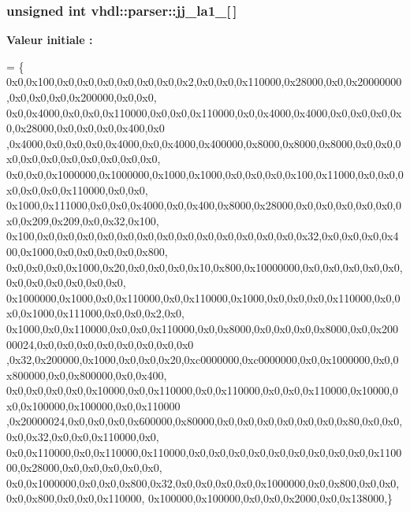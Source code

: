 \subsubsection[{jj\+\_\+la1\+\_\+2}]{\setlength{\rightskip}{0pt plus 5cm}unsigned int vhdl\+::parser\+::jj\+\_\+la1\+\_\mbox{[}$\,$\mbox{]}}\label{namespacevhdl_1_1parser_a2ce8ed90b801cc69d059b4f3732c8da3}
{\bfseries Valeur initiale \+:}
\begin{DoxyCode}
= \{
0x0,0x100,0x0,0x0,0x0,0x0,0x0,0x0,0x2,0x0,0x0,0x110000,0x28000,0x0,0x20000000,0x0,0x0,0x0,0x200000,0x0,0x0,
      0x0,0x4000,0x0,0x0,0x110000,0x0,0x0,0x110000,0x0,0x4000,0x4000,0x0,0x0,0x0,0x0,0x28000,0x0,0x0,0x0,0x400,0x0
      ,0x4000,0x0,0x0,0x0,0x4000,0x0,0x4000,0x400000,0x8000,0x8000,0x8000,0x0,0x0,0x0,0x0,0x0,0x0,0x0,0x0,0x0,0x0,
      0x0,0x0,0x1000000,0x1000000,0x1000,0x1000,0x0,0x0,0x0,0x100,0x11000,0x0,0x0,0x0,0x0,0x0,0x110000,0x0,0x0,
      0x1000,0x111000,0x0,0x0,0x4000,0x0,0x400,0x8000,0x28000,0x0,0x0,0x0,0x0,0x0,0x0,0x209,0x209,0x0,0x32,0x100,
      0x100,0x0,0x0,0x0,0x0,0x0,0x0,0x0,0x0,0x0,0x0,0x0,0x0,0x0,0x32,0x0,0x0,0x0,0x400,0x1000,0x0,0x0,0x0,0x0,0x800,
      0x0,0x0,0x0,0x1000,0x20,0x0,0x0,0x0,0x10,0x800,0x10000000,0x0,0x0,0x0,0x0,0x0,0x0,0x0,0x0,0x0,0x0,0x0,
      0x1000000,0x1000,0x0,0x110000,0x0,0x110000,0x1000,0x0,0x0,0x0,0x110000,0x0,0x0,0x1000,0x111000,0x0,0x0,0x2,0x0,
      0x1000,0x0,0x110000,0x0,0x0,0x110000,0x0,0x8000,0x0,0x0,0x0,0x8000,0x0,0x20000024,0x0,0x0,0x0,0x0,0x0,0x0,0x0,0x0
      ,0x32,0x200000,0x1000,0x0,0x0,0x20,0xc0000000,0xc0000000,0x0,0x1000000,0x0,0x800000,0x0,0x800000,0x0,0x400,
      0x0,0x0,0x0,0x0,0x10000,0x0,0x110000,0x0,0x110000,0x0,0x0,0x110000,0x10000,0x0,0x100000,0x100000,0x0,0x110000
      ,0x20000024,0x0,0x0,0x0,0x600000,0x80000,0x0,0x0,0x0,0x0,0x0,0x0,0x80,0x0,0x0,0x0,0x32,0x0,0x0,0x110000,0x0,
      0x0,0x110000,0x0,0x110000,0x110000,0x0,0x0,0x0,0x0,0x0,0x0,0x0,0x0,0x0,0x110000,0x28000,0x0,0x0,0x0,0x0,0x0,
      0x0,0x1000000,0x0,0x0,0x800,0x32,0x0,0x0,0x0,0x0,0x1000000,0x0,0x800,0x0,0x0,0x0,0x800,0x0,0x0,0x110000,
      0x100000,0x100000,0x0,0x0,0x2000,0x0,0x138000,\}
\end{DoxyCode}
\hypertarget{namespacevhdl_1_1parser_ab8a4cb3eb6e58082964968187e10d5cd}{}
